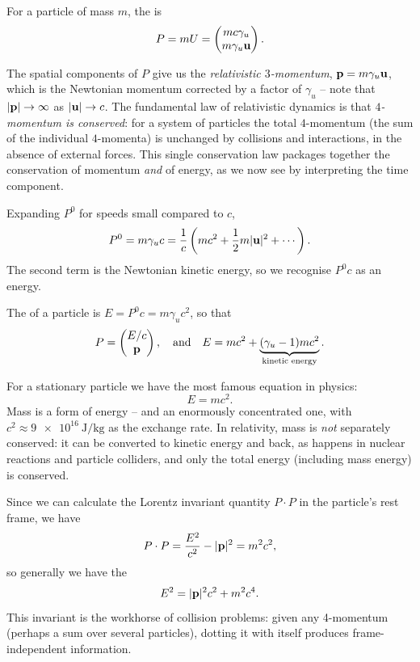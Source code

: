 \documentclass[a4paper]{scrartcl}
\begin{document}
\begin{definition}[4-Momentum]
	For a particle of mass $m$, the  is
	$$
	P = mU = \begin{pmatrix}
		mc \gamma_u \\
		m \gamma_u \mathbf{u}
	\end{pmatrix}.
	$$
\end{definition}

The spatial components of $P$ give us the \emph{relativistic $3$-momentum}, $\mathbf{p} = m \gamma_u \mathbf{u}$, which is the Newtonian momentum corrected by a factor of $\gamma_u$ -- note that $|\mathbf{p}| \to \infty$ as $|\mathbf{u}| \to c$. The fundamental law of relativistic dynamics is that \emph{$4$-momentum is conserved}: for a system of particles the total $4$-momentum (the sum of the individual $4$-momenta) is unchanged by collisions and interactions, in the absence of external forces. This single conservation law packages together the conservation of momentum \emph{and} of energy, as we now see by interpreting the time component.

Expanding $P^0$ for speeds small compared to $c$,
$$
P^0 = m\gamma_u c = \frac{1}{c}\left(mc^2 + \frac{1}{2}m|\mathbf{u}|^2 + \cdots\right).
$$
The second term is the Newtonian kinetic energy, so we recognise $P^0 c$ as an energy.

\begin{definition}
	The  of a particle is $E = P^0 c = m\gamma_u c^2$, so that
	$$
	P = \begin{pmatrix}
		E/c \\ \mathbf{p}
	\end{pmatrix}, \quad \text{and} \quad E = mc^2 + \underbrace{(\gamma_u - 1)mc^2}_{\text{kinetic energy}}.
	$$
\end{definition}

For a stationary particle we have the most famous equation in physics:
$$
E = mc^2.
$$
Mass is a form of energy -- and an enormously concentrated one, with $c^2 \approx \SI{9e16}{\joule\per\kilogram}$ as the exchange rate. In relativity, mass is \emph{not} separately conserved: it can be converted to kinetic energy and back, as happens in nuclear reactions and particle colliders, and only the total energy (including mass energy) is conserved.

Since we can calculate the Lorentz invariant quantity $P \cdot P$ in the particle's rest frame, we have
$$
P \cdot P = \frac{E^2}{c^2} - |\mathbf{p}|^2 = m^2 c^2,
$$
so generally we have the 
$$
E^2 = |\mathbf{p}|^2 c^2 + m^2 c^4.
$$
This invariant is the workhorse of collision problems: given any 4-momentum (perhaps a sum over several particles), dotting it with itself produces frame-independent information.
\end{document}
